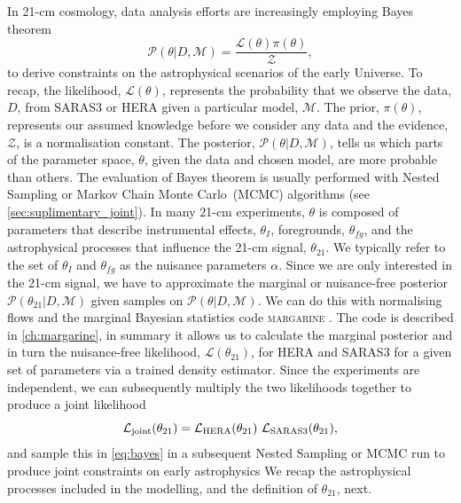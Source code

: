 In 21-cm cosmology, data analysis efforts are increasingly employing Bayes theorem 
\begin{equation}
    \mathcal{P}(\theta|D, \mathcal{M}) = \frac{\mathcal{L}(\theta) \pi(\theta)}{\mathcal{Z}},
    \label{eq:bayes}
\end{equation}
to derive constraints on the astrophysical scenarios of the early Universe. To recap, the likelihood, $\mathcal{L}(\theta)$, represents the probability that we observe the data, $D$, from SARAS3 or HERA given a particular model, $\mathcal{M}$. The prior, $\pi(\theta)$, represents our assumed knowledge before we consider any data and the evidence, $\mathcal{Z}$, is a normalisation constant.
The posterior, $\mathcal{P}(\theta|D, \mathcal{M})$, tells us which parts of the parameter space, $\theta$, given the data and chosen model, are more probable than others. The evaluation of Bayes theorem is usually performed with Nested Sampling or Markov Chain Monte Carlo~(MCMC) algorithms (see \cref{sec:suplimentary_joint}). In many 21-cm experiments, $\theta$ is composed of parameters that describe instrumental effects, $\theta_{I}$, foregrounds, $\theta_{fg}$, and the astrophysical processes that influence the 21-cm signal, $\theta_{21}$. We typically refer to the set of $\theta_{I}$ and $\theta_{fg}$ as the nuisance parameters $\alpha$. Since we are only interested in the 21-cm signal, we have to approximate the marginal or nuisance-free posterior $\mathcal{P}(\theta_{21}|D, \mathcal{M})$ given samples on $\mathcal{P}(\theta|D, \mathcal{M})$. We can do this with normalising flows and the marginal Bayesian statistics code \textsc{margarine} \cite{margarine_neurips, margarine_maxent}. The code is described in \cref{ch:margarine}, in summary it allows us to calculate the marginal posterior and in turn the nuisance-free likelihood, $\mathcal{L}(\theta_{21})$, for HERA and SARAS3 for a given set of parameters via a trained density estimator. Since the experiments are independent, we can subsequently multiply the two likelihoods together to produce a joint likelihood
\begin{equation}
    \mathcal{L}_{\textnormal{joint}}(\theta_{21}) = \mathcal{L}_{\textnormal{HERA}}(\theta_{21})~\mathcal{L}_{\textnormal{SARAS3}}(\theta_{21}),
\end{equation}
and sample this in \cref{eq:bayes} in a subsequent Nested Sampling or MCMC run to produce joint constraints on early astrophysics
We recap the astrophysical processes included in the modelling,  and the definition of $\theta_{21}$, next.

